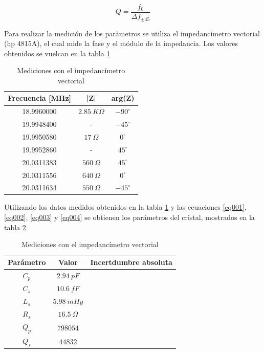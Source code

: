 \documentclass[a4paper,10pt]{article}
\begin{document}
		\begin{equation} \label{eq004}
			Q = \frac{f_0}{\Delta f_{\pm45}}
		\end{equation}
		
		\indent Para realizar la medición de los parámetros se utiliza el 
		impedancímetro vectorial (hp 4815A), el cual mide la fase y el módulo de
		la impedancia. Los valores obtenidos se vuelcan en la tabla \ref{tab003}
		\begin{table}[!htp]
			\centering
			\begin{tabular}{|c|c|c|}
				\hline
				Frecuencia [MHz] & |Z| & arg(Z) \\
				\hline
				18.9960000 & $2.85~K\Omega$ & $-90^{\circ}$ \\
				\hline
				19.9948400 & - & $-45^{\circ}$ \\ 
				\hline
				19.9950580 & $17~\Omega$ & $0^{\circ}$ \\
				\hline
				19.9952860 & - & $45^{\circ}$ \\ 
				\hline									
				20.0311383 & $560~\Omega$ & $45^{\circ}$ \\
				\hline									
				20.0311556 & $640~\Omega$ & $0^{\circ}$ \\
				\hline									
				20.0311634 & $550~\Omega$ & $-45^{\circ}$ \\
				\hline									
			\end{tabular}
			\caption{Mediciones con el impedancímetro vectorial} \label{tab003}
		\end{table}	
		
		\indent Utilizando los datos medidos obtenidos en la tabla \ref{tab003}
		y las ecuaciones \ref{eq001}, \ref{eq002}, \ref{eq003} y \ref{eq004} se
		obtienen los parámetros del cristal, mostrados en la tabla \ref{tab004}
		\begin{table}[!htp]
			\centering
			\begin{tabular}{|c|c|c|}
				\hline
				Parámetro & Valor & Incertdumbre absoluta \\
				\hline
				$C_p$ & $2.94~pF$ & \\
				\hline
				$C_s$ & $10.6~fF$ & \\ 
				\hline
				$L_s$ & $5.98~mHy$ & \\
				\hline
				$R_s$ & $16.5~\Omega$ & \\ 
				\hline									
				$Q_p$ & $798054$ & \\
				\hline
				$Q_s$ & $44832$  & \\
				\hline
			\end{tabular}
			\caption{Mediciones con el impedancímetro vectorial} \label{tab004}
		\end{table}	
\end{document}
